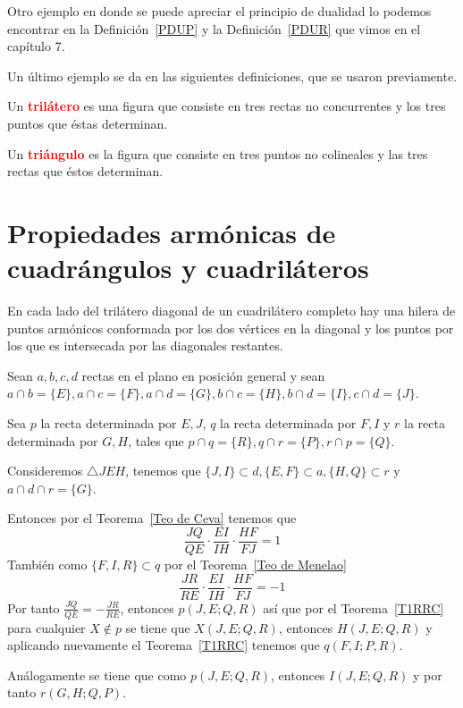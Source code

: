 Otro ejemplo en donde se puede apreciar el principio de dualidad lo podemos encontrar en la Definición~\ref{PDUP} y la Definición~\ref{PDUR} que vimos en el capítulo 7.

Un último ejemplo se da en las siguientes definiciones, que se usaron previamente.

\begin{df}\label{trilátero}
Un \textcolor{red}{\bf trilátero} es una figura que consiste en tres rectas no concurrentes y los tres puntos que éstas determinan. 
\end{df}
\begin{df}
Un \textcolor{red}{\bf triángulo} es la figura que consiste en tres puntos no colineales y las tres rectas que éstos determinan.   
\end{df}
\section{Propiedades armónicas de cuadrángulos y cuadriláteros}
\begin{teo}
En cada lado del trilátero diagonal de un cuadrilátero completo hay una hilera de puntos armónicos conformada por los dos vértices en la diagonal y los puntos por los que es intersecada por las diagonales restantes.
\end{teo}
\begin{pba}
Sean $a,b,c,d$ rectas en el plano en posición general y sean $a\cap b=\{E\}, a\cap c=\{F\}, a\cap d=\{G\}, b\cap c=\{H\}, b\cap d=\{I\}, c\cap d=\{J\}$. 

Sea $p$ la recta determinada por $E,J$, $q$ la recta determinada por $F,I$ y $r$ la recta determinada por $G,H$, tales que $p\cap q=\{R\}, q\cap r=\{P\}, r\cap p=\{Q\}$. 

Consideremos $\triangle JEH$, tenemos que $\{J,I\}\subset d, \{E,F\}\subset a, \{H,Q\}\subset r$ y $a\cap d\cap r=\{G\}$. 

Entonces por el Teorema~\ref{Teo de Ceva} tenemos que 
$$\frac{JQ}{QE}\cdot\frac{EI}{IH}\cdot\frac{HF}{FJ}=1$$
También como $\{F,I,R\}\subset q$ por el Teorema~\ref{Teo de Menelao}
$$\frac{JR}{RE}\cdot\frac{EI}{IH}\cdot\frac{HF}{FJ}=-1$$
Por tanto $\frac{JQ}{QE}=-\frac{JR}{RE}$, entonces $p(J,E;Q,R)$ así que por el Teorema~\ref{T1RRC} para cualquier $X\notin p$ se tiene que $X(J,E;Q,R)$, entonces $H(J,E;Q,R)$ y aplicando nuevamente el Teorema~\ref{T1RRC} tenemos que $q(F,I;P,R)$.

Análogamente se tiene que como $p(J,E;Q,R)$, entonces $I(J,E;Q,R)$ y por tanto $r(G,H;Q,P)$.
\end{pba}

